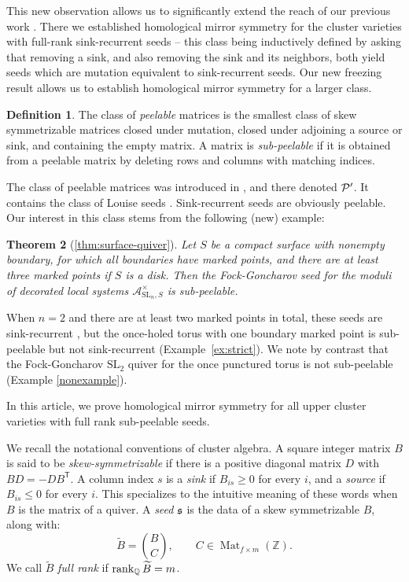 \documentclass[12pt, letter]{amsart}
\newtheorem{theorem}{Theorem}[section]
\theoremstyle{definition}
\newtheorem{definition}[theorem]{Definition}
\newcommand{\Z}{\mathbb Z}
\newcommand{\Q}{\mathbb Q}
\numberwithin{equation}{section}
\begin{document}
This new observation allows us to significantly extend the reach of our previous work \cite{HS}.  There we established homological mirror symmetry for the cluster varieties with full-rank sink-recurrent seeds -- this class being inductively defined by asking that removing a sink, and also removing the sink and its neighbors, both yield seeds which are mutation equivalent to sink-recurrent seeds.  Our new freezing result allows us to establish homological mirror symmetry for a larger class. 




\begin{definition}
\label{def:subpeelable}
The class of \emph{peelable} matrices is the smallest class of skew symmetrizable matrices closed under mutation, closed under adjoining a source or sink, and containing the empty matrix.
A matrix is \emph{sub-peelable} if it is obtained from a peelable matrix by deleting rows and columns with matching indices.
\end{definition}

The class of peelable matrices was introduced in \cite{Ladkani}, and there denoted $\mathcal{P}'$.  It  contains the class of Louise seeds \cite{EJ}.  Sink-recurrent seeds are obviously peelable.
Our interest in this class stems from the following (new) example: 


\begin{theorem}[\ref{thm:surface-quiver}] \label{thm:fg-sub-peelable}
    Let $S$ be a compact surface with nonempty boundary, for which all boundaries have marked points, and there are at least three marked points if $S$ is a disk.  Then the Fock-Goncharov seed for the moduli of decorated local systems $\mathcal{A}^\times_{\mathrm{SL}_n, S}$ is sub-peelable.
\end{theorem}

When $n=2$ and there are at least two marked points in total, these seeds are sink-recurrent \cite[Proposition~D.1]{HS}, but the once-holed torus with one boundary marked point is sub-peelable but not sink-recurrent (Example~\ref{ex:strict}).  
We note by contrast that the Fock-Goncharov $\mathrm{SL}_2$ quiver for the once punctured torus is not sub-peelable (Example \ref{nonexample}).

In this article, we prove homological mirror symmetry for all upper cluster varieties with full rank sub-peelable seeds. 


We recall the notational conventions of cluster algebra.
A square integer matrix \(B\) is said to be {\em skew-symmetrizable} if there is a positive diagonal matrix $D$ with $BD = - DB^{\mathsf T}$.
A column index $s$ is a \emph{sink} if $B_{is}\ge0$ for every $i$, and a
\emph{source} if $B_{is}\le0$ for every $i$.  This specializes to the intuitive meaning of these words when $B$ is the matrix of a quiver.  A {\em seed} $\mathfrak{s}$ is the data of a skew symmetrizable $B$, along with:
\[
 \widetilde B=\binom BC,
 \qquad 
 C\in\operatorname{Mat}_{f\times m}(\Z).
\]
We call
$\widetilde B$ \emph{full rank} if $\rank_{\Q}\widetilde B=m$.
\end{document}
